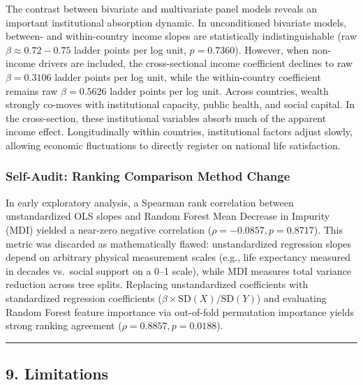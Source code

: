 \documentclass[
]{article}
\begin{document}
The contrast between bivariate and multivariate panel models reveals an
important institutional absorption dynamic. In unconditioned bivariate
models, between- and within-country income slopes are statistically
indistinguishable (raw \(\beta \approx 0.72 - 0.75\) ladder points per
log unit, \(p = 0.7360\)). However, when non-income drivers are
included, the cross-sectional income coefficient declines to raw
\(\beta = 0.3106\) ladder points per log unit, while the within-country
coefficient remains raw \(\beta = 0.5626\) ladder points per log unit.
Across countries, wealth strongly co-moves with institutional capacity,
public health, and social capital. In the cross-section, these
institutional variables absorb much of the apparent income effect.
Longitudinally within countries, institutional factors adjust slowly,
allowing economic fluctuations to directly register on national life
satisfaction.

\hypertarget{self-audit-ranking-comparison-method-change}{%
\subsubsection{Self-Audit: Ranking Comparison Method
Change}\label{self-audit-ranking-comparison-method-change}}

In early exploratory analysis, a Spearman rank correlation between
unstandardized OLS slopes and Random Forest Mean Decrease in Impurity
(MDI) yielded a near-zero negative correlation
(\(\rho = -0.0857, p = 0.8717\)). This metric was discarded as
mathematically flawed: unstandardized regression slopes depend on
arbitrary physical measurement scales (e.g., life expectancy measured in
decades vs.~social support on a 0--1 scale), while MDI measures total
variance reduction across tree splits. Replacing unstandardized
coefficients with standardized regression coefficients
(\(\beta \times \text{SD}(X) / \text{SD}(Y)\)) and evaluating Random
Forest feature importance via out-of-fold permutation importance yields
strong ranking agreement
(\(\rho = \mathbf{0.8857}, p = \mathbf{0.0188}\)).

\begin{center}\rule{0.5\linewidth}{0.5pt}\end{center}

\hypertarget{limitations}{%
\subsection{9. Limitations}\label{limitations}}
\end{document}
